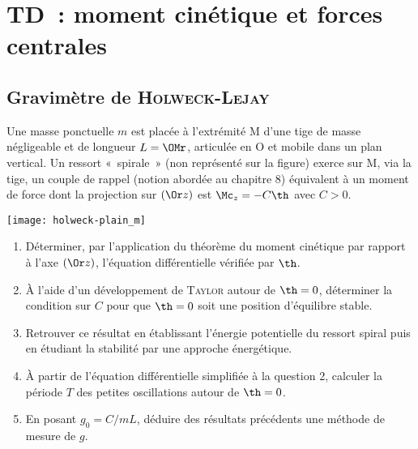 \documentclass[a4paper, 10pt, final, garamond]{book}
\begin{document}


\chapter{TD~: moment cin\'etique et forces centrales}


\section{Gravimètre de \textsc{Holweck-Lejay}}

Une masse ponctuelle $m$ est placée à l'extrémité M d'une tige de masse
négligeable et de longueur $L = \OMr$, articulée en O et mobile dans un plan
vertical. Un ressort «~spirale~» (non représenté sur la figure) exerce sur M,
via la tige, un couple de rappel (notion abordée au chapitre 8) équivalent à un
moment de force dont la projection sur $(\Or z)$ est $\Mc_z = -C\th$ avec $C>0$.

\noindent
\begin{minipage}[]{0.25\linewidth}
	\begin{center}
		\texttt{[image: holweck-plain\_m]}
	\end{center}
\end{minipage}
\hfill
\begin{minipage}[]{0.70\linewidth}
	\begin{enumerate}
		\item Déterminer, par l'application du théorème du moment cinétique par
		      rapport à l'axe $(\Or z)$, l'équation différentielle vérifiée par
		      $\th$.
		\item À l'aide d'un développement de \textsc{Taylor} autour de $\th =
			      0$, déterminer la condition sur $C$ pour que $\th = 0$ soit une
		      position d'équilibre stable.
		\item Retrouver ce résultat en établissant l'énergie potentielle du
		      ressort spiral puis en étudiant la stabilité par une approche
		      énergétique.
		\item À partir de l'équation différentielle simplifiée à la question 2,
		      calculer la période $T$ des petites oscillations autour de $\th =
			      0$.
		\item En posant $g_0 = C/mL$, déduire des résultats précédents une
		      méthode de mesure de $g$.
	\end{enumerate}
\end{minipage}
\end{document}
